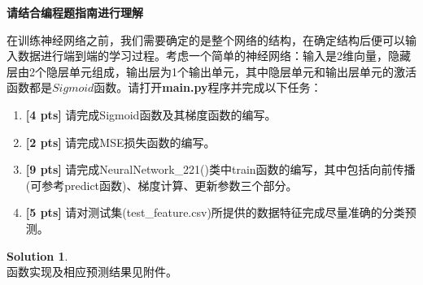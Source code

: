 \documentclass[a4paper,UTF8]{article}
\theoremstyle{definition}
\newtheorem*{solution}{Solution}
\begin{document}
\textbf{请结合编程题指南进行理解}
\par 在训练神经网络之前，我们需要确定的是整个网络的结构，在确定结构后便可以输入数据进行端到端的学习过程。考虑一个简单的神经网络：输入是2维向量，隐藏层由2个隐层单元组成，输出层为1个输出单元，其中隐层单元和输出层单元的激活函数都是$Sigmoid$函数。请打开\textbf{main.py}程序并完成以下任务：
\begin{enumerate}[(1)]
	\item \textbf{[4 pts]} 请完成Sigmoid函数及其梯度函数的编写。
	\item \textbf{[2 pts]} 请完成MSE损失函数的编写。
	\item \textbf{[9 pts]} 请完成NeuralNetwork\_221()类中train函数的编写，其中包括向前传播(可参考predict函数)、梯度计算、更新参数三个部分。
	\item \textbf{[5 pts]} 请对测试集(test\_feature.csv)所提供的数据特征完成尽量准确的分类预测。
\end{enumerate}

\begin{solution}
~\\函数实现及相应预测结果见附件。
\end{solution}



\end{document}
